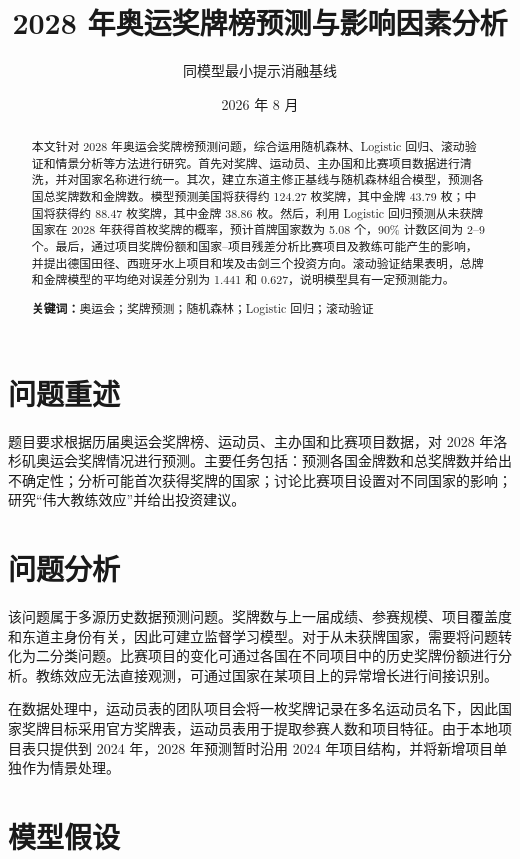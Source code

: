 \documentclass[UTF8,11pt,a4paper]{ctexart}
\title{2028 年奥运奖牌榜预测与影响因素分析}
\author{同模型最小提示消融基线}
\date{2026 年 8 月}
\begin{document}
\maketitle

\begin{abstract}
本文针对 2028 年奥运会奖牌榜预测问题，综合运用随机森林、Logistic 回归、滚动验证和情景分析等方法进行研究。首先对奖牌、运动员、主办国和比赛项目数据进行清洗，并对国家名称进行统一。其次，建立东道主修正基线与随机森林组合模型，预测各国总奖牌数和金牌数。模型预测美国将获得约 124.27 枚奖牌，其中金牌 43.79 枚；中国将获得约 88.47 枚奖牌，其中金牌 38.86 枚。然后，利用 Logistic 回归预测从未获牌国家在 2028 年获得首枚奖牌的概率，预计首牌国家数为 5.08 个，90\% 计数区间为 2--9 个。最后，通过项目奖牌份额和国家--项目残差分析比赛项目及教练可能产生的影响，并提出德国田径、西班牙水上项目和埃及击剑三个投资方向。滚动验证结果表明，总牌和金牌模型的平均绝对误差分别为 1.441 和 0.627，说明模型具有一定预测能力。

\noindent\textbf{关键词：}奥运会；奖牌预测；随机森林；Logistic 回归；滚动验证
\end{abstract}

\tableofcontents
\newpage

\section{问题重述}

题目要求根据历届奥运会奖牌榜、运动员、主办国和比赛项目数据，对 2028 年洛杉矶奥运会奖牌情况进行预测。主要任务包括：预测各国金牌数和总奖牌数并给出不确定性；分析可能首次获得奖牌的国家；讨论比赛项目设置对不同国家的影响；研究“伟大教练效应”并给出投资建议。

\section{问题分析}

该问题属于多源历史数据预测问题。奖牌数与上一届成绩、参赛规模、项目覆盖度和东道主身份有关，因此可建立监督学习模型。对于从未获牌国家，需要将问题转化为二分类问题。比赛项目的变化可通过各国在不同项目中的历史奖牌份额进行分析。教练效应无法直接观测，可通过国家在某项目上的异常增长进行间接识别。

在数据处理中，运动员表的团队项目会将一枚奖牌记录在多名运动员名下，因此国家奖牌目标采用官方奖牌表，运动员表用于提取参赛人数和项目特征。由于本地项目表只提供到 2024 年，2028 年预测暂时沿用 2024 年项目结构，并将新增项目单独作为情景处理。

\section{模型假设}
\end{document}
